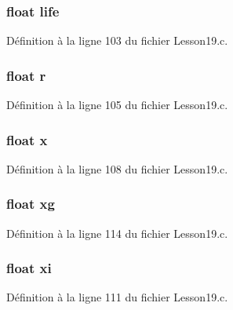 \subsubsection[{life}]{\setlength{\rightskip}{0pt plus 5cm}float life}\label{structparticles_a6283673946355f360ce6a174f919a942}


Définition à la ligne 103 du fichier Lesson19.\+c.

\hypertarget{structparticles_a4788d82c901b9367dd5c0daff8a7616b}{}
\subsubsection[{r}]{\setlength{\rightskip}{0pt plus 5cm}float r}\label{structparticles_a4788d82c901b9367dd5c0daff8a7616b}


Définition à la ligne 105 du fichier Lesson19.\+c.

\hypertarget{structparticles_ad0da36b2558901e21e7a30f6c227a45e}{}
\subsubsection[{x}]{\setlength{\rightskip}{0pt plus 5cm}float x}\label{structparticles_ad0da36b2558901e21e7a30f6c227a45e}


Définition à la ligne 108 du fichier Lesson19.\+c.

\hypertarget{structparticles_a1b0cf5d5798f0b2062544358ca46ffd1}{}
\subsubsection[{xg}]{\setlength{\rightskip}{0pt plus 5cm}float xg}\label{structparticles_a1b0cf5d5798f0b2062544358ca46ffd1}


Définition à la ligne 114 du fichier Lesson19.\+c.

\hypertarget{structparticles_a39291e1e7c5545a7b8a9c64b89d973f9}{}
\subsubsection[{xi}]{\setlength{\rightskip}{0pt plus 5cm}float xi}\label{structparticles_a39291e1e7c5545a7b8a9c64b89d973f9}


Définition à la ligne 111 du fichier Lesson19.\+c.

